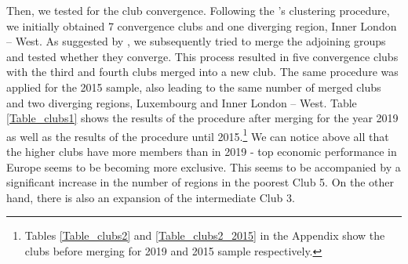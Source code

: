 \documentclass[11pt]{article}
\begin{document}
Then, we tested for the club convergence. Following the \citeauthor{phillips2007transition}'s clustering procedure, we initially obtained 7 convergence clubs and one diverging region, Inner London – West. As suggested by \citet{bartkowska2012regional}, we subsequently tried to merge the adjoining groups and tested whether they converge. This process resulted in five convergence clubs with the third and fourth clubs merged into a new club. The same procedure was applied for the 2015 sample, also leading to the same number of merged clubs and two diverging regions, Luxembourg and Inner London – West. Table \ref{Table_clubs1} shows the results of the procedure after merging for the year 2019 as well as the results of the \citeauthor{phillips2007transition} procedure until 2015.\footnote{Tables \ref{Table_clubs2} and \ref{Table_clubs2_2015} in the Appendix show the clubs before merging for 2019 and 2015 sample respectively.}  We can notice above all that the higher clubs have more members than in 2019 - top economic performance in Europe seems to be becoming more exclusive. This seems to be accompanied by a significant increase in the number of regions in the poorest Club 5. On the other hand, there is also an expansion of the intermediate Club 3.
\end{document}
